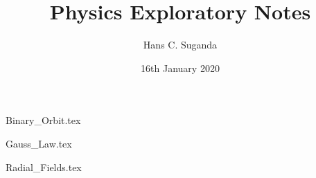 \documentclass[a4paper, 12pt]{report}
\begin{document}
\title{Physics Exploratory Notes}
\author{Hans C. Suganda}
\date{16th January 2020}
\maketitle
\newpage

\tableofcontents

\begin{center}
{Binary_Orbit.tex}
\begin{comment}
Start Level: chapter
End Level: chapter
Aditional Comments:
\end{comment}
{Gauss_Law.tex}
\begin{comment}
Start Level: chapter
End Level: chapter
Aditional Comments:
\end{comment}
{Radial_Fields.tex}
\begin{comment}
Start Level: chapter
End Level: chapter
Aditional Comments:
\end{comment}

\end{center}
\end{document}
